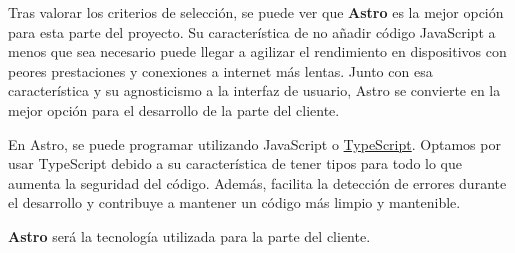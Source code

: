 Tras valorar los criterios de selección, se puede ver que \textbf{Astro} es la mejor opción para esta parte del proyecto. Su característica de no añadir código JavaScript a menos que sea necesario puede llegar a agilizar el rendimiento en dispositivos con peores prestaciones y conexiones a internet más lentas. Junto con esa característica y su agnosticismo a la interfaz de usuario, Astro se convierte en la mejor opción para el desarrollo de la parte del cliente.

En Astro, se puede programar utilizando JavaScript o \href{https://www.typescriptlang.org/}{TypeScript}. Optamos por usar TypeScript debido a su característica de tener tipos para todo lo que aumenta la seguridad del código. Además, facilita la detección de errores durante el desarrollo y contribuye a mantener un código más limpio y mantenible.

\textbf{Astro} será la tecnología utilizada para la parte del cliente.
